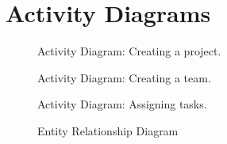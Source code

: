 \section{Activity Diagrams}
\begin{figure}[ht]
\centering
{}
\caption{Activity Diagram: Creating a project.}
\end{figure}
\begin{figure}[ht]
\centering
{}
\caption{Activity Diagram: Creating a team.}
\end{figure}
\begin{figure}[ht]
\centering
{}
\caption{Activity Diagram: Assigning tasks.}
\end{figure}
\begin{figure}[ht]
\centering
{}
\caption{Entity Relationship Diagram}
\end{figure}